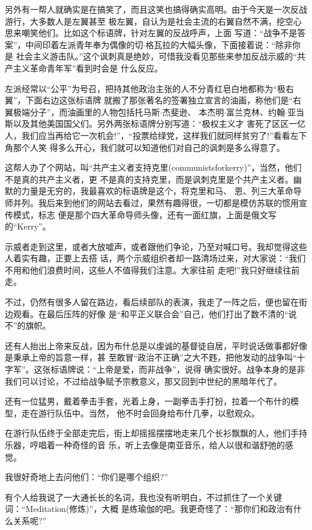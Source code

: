 ﻿\documentclass[11pt]{article}
\begin{document}
另外有一帮人就确实是在搞笑了，而且这笑也搞得确实高明。由于今天是一次反战游行，大多数人是左翼甚至
极左翼，自认为是社会主流的右翼自然不满，挖空心思来嘲笑他们。比如这个标语牌，针对左翼的反战呼声，上面
写道：``战争不是答案''，中间印着左派青年奉为偶像的切$\cdot$格瓦拉的大幅头像，下面接着说：``除非你是
社会主义游击队。''这个讽刺真是绝妙，可惜我没看见那些来参加反战示威的``共产主义革命青年军''看到时会是
什么反应。

左派经常以``公平''为号召，把持其他政治主张的人不分青红皂白地都称为``极右翼''，下面右边这张标语牌
就搬了那张著名的签署独立宣言的油画，称他们是``右翼极端分子''，而油画里的人物包括托马斯$\cdot$杰斐逊、
本杰明$\cdot$富兰克林、约翰$\cdot$亚当斯以及其他美国国父们。另外两张标语牌分别写道：``极权主义才
害死了区区一亿人，我们应当再给它一次机会!''，``投票给绿党，这样我们就同样贫穷了!''看看左下角那个人笑
得多么开心，我们就可以知道他们对自己的讽刺是多么得意了。

这帮人办了个网站，叫``共产主义者支持克里(communistsforkerry)''，当然，他们不是真的共产主义者，更
不是真的支持克里，而是讽刺克里是个共产主义者。幽默的力量是无穷的，我最喜欢的标语牌是这个，将克里和马、
恩、列三大革命导师并列。我后来到他们的网站去看过，果然有趣得很，一切都是模仿苏联的惯用宣传模式，标志
便是那个四大革命导师头像，还有一面红旗，上面是俄文写的``Kerry''。

示威者走到这里，或者大放嘘声，或者跟他们争论，乃至对喊口号。我却觉得这些人着实有趣，正要上去搭
话，两个示威组织者却一路清场过来，对大家说：``我们不用和他们浪费时间，这些人不值得我们注意。大家往前
走吧!''我只好继续往前走。

不过，仍然有很多人留在路边，看后续部队的表演，我走了一阵之后，便也留在街边观看。在最后压阵的好像
是``和平正义联合会''自己，他们打出了数不清的``说不''的旗帜。

还有人抬出上帝来反战，因为布什总是以虔诚的基督徒自居，平时说话做事都好像是秉承上帝的旨意一样，甚
至敢冒``政治不正确''之大不韪，把他发动的战争叫``十字军''。这张标语牌说：``上帝是爱，而非战争''，说得
确实很好。战争本身的是非我们可以讨论，不过给战争赋予宗教意义，那又回到中世纪的黑暗年代了。

还有一位猛男，戴着拳击手套，光着上身，一副拳击手打扮，拉着一个布什的模型，走在游行队伍中。当然，
他不时会回身给布什几拳，以慰观众。

在游行队伍终于全部走完后，街上却摇摇摆摆地走来几个长衫飘飘的人，他们手持乐器，哼唱着一种奇怪的音
乐，听上去像是南亚音乐，给人以很和谐舒弛的感觉。

我很好奇地上去问他们：``你们是哪个组织?''

有个人给我说了一大通长长的名词，我也没有听明白，不过抓住了一个关键词：``Meditation(修炼)''，大概
是练瑜伽的吧。我更奇怪了：``那你们和政治有什么关系呢?''
\end{document}
